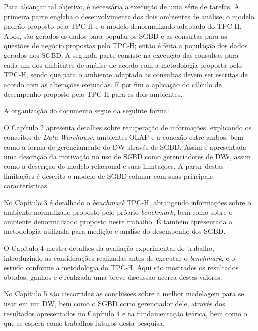 Para alcançar tal objetivo, é necessária a execução de uma série de tarefas. A primeira parte engloba o 
desenvolvimento dos dois ambientes de análise, o modelo padrão proposto pelo TPC-H e o modelo denormalizado adaptado do TPC-H. Após, são gerados os 
dados para popular os SGBD e as consultas para as questões de negócio propostas pelo TPC-H; então é feita a população dos dados gerados nos SGBD. 
A segunda parte consiste na execução das consultas para cada um dos ambientes de análise de acordo com a metodologia proposta pelo TPC-H, sendo que para o ambiente adaptado as consultas devem 
ser escritas de acordo com as alterações efetuadas. E por fim a aplicação do cálculo de desempenho proposto pelo TPC-H para os dois ambientes. 

A organização do documento segue da seguinte forma: 

O Capítulo 2 apresenta detalhes sobre recuperação de informações, explicando os conceitos de \textit{Data Warehouse}, ambientes OLAP e a conexão entre ambos, bem como a forma de gerenciamento do DW através de SGBD. Assim é apresentada uma descrição da motivação no uso de SGBD como gerenciadores de DWs, assim como a descrição do modelo relacional e suas limitações. A partir destas limitações é descrito o modelo de SGBD colunar com suas principais características.

No Capítulo 3 é detalhado o \textit{benchmark} TPC-H, abrangendo informações sobre o ambiente normalizado proposto pelo próprio \textit{benchmark}, bem como sobre o ambiente denormalizado proposto neste trabalho. É também apresentada a metodologia utilizada para medição e análise do desempenho dos SGBD.

O Capítulo 4 mostra detalhes da avaliação experimental do trabalho, introduzindo as considerações realizadas antes de executar o \textit{benchmark}, e o estudo conforme a metodologia do TPC-H. Aqui são mostrados os resultados obtidos, ganhos e é realizada uma breve discussão acerca destes valores.

No Capítulo 5 são discorridas as conclusões sobre a melhor modelagem para se usar em um DW, bem como o SGBD como gerenciador dele, através dos resultados apresentados no Capítulo 4 e na fundamentação teórica, bem como o que se espera como trabalhos futuros desta pesquisa. 
